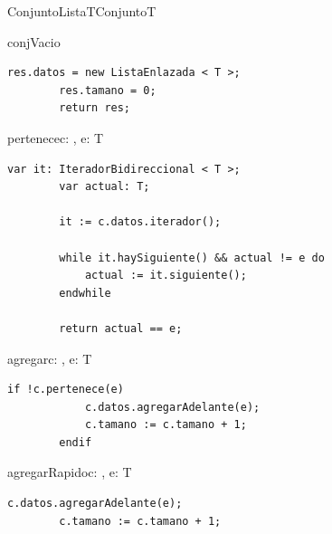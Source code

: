 \begin{module}{ConjuntoLista}{T}{Conjunto}{T}




	\begin{proc}{conjVacio}{}{\moduletype}
		\begin{lstlisting}[numbers=none,frame=none]
		res.datos = new ListaEnlazada < T >;
		res.tamano = 0;
		return res;
		\end{lstlisting}
	\end{proc}

	\begin{proc}{pertenece}{\In c: \moduletype, \In e: T}{\bool}
		\begin{lstlisting}[numbers=none,frame=none]
		var it: IteradorBidireccional < T >;
		var actual: T;

		it := c.datos.iterador();

		while it.haySiguiente() && actual != e do
			actual := it.siguiente();
		endwhile
		
		return actual == e;
		\end{lstlisting}
	\end{proc}

	\begin{proc}{agregar}{\Inout c: \moduletype, \In e: T}{}
		\begin{lstlisting}[numbers=none,frame=none]
		if !c.pertenece(e)
			c.datos.agregarAdelante(e);
			c.tamano := c.tamano + 1;
		endif
		\end{lstlisting}
	\end{proc}

	\begin{proc}{agregarRapido}{\Inout c: \moduletype, \In e: T}{}
		\begin{lstlisting}[numbers=none,frame=none]
		c.datos.agregarAdelante(e);
		c.tamano := c.tamano + 1;
		\end{lstlisting}
	\end{proc}


\end{module}
